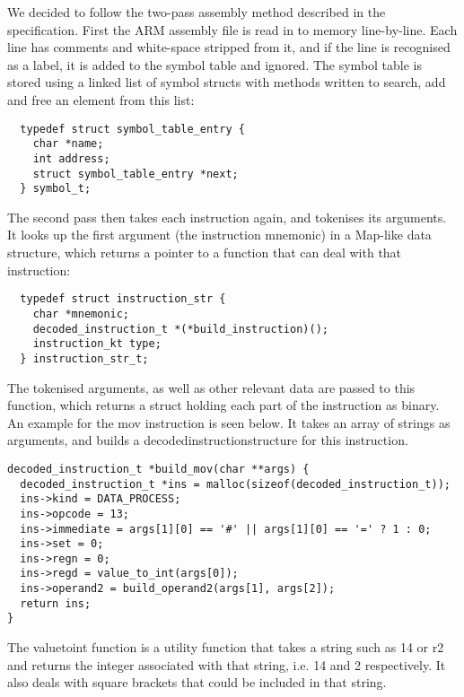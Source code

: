 We decided to follow the two-pass assembly method described in the specification. First the ARM assembly file is read in to memory line-by-line. Each line has comments and white-space stripped from it, and if the line is recognised as a label, it is added to the symbol table and ignored. The symbol table is stored using a linked list of symbol structs with methods written to search, add and free an element from this list:

\begin{verbatim}
  typedef struct symbol_table_entry {
    char *name;
    int address;
    struct symbol_table_entry *next;
  } symbol_t;
\end{verbatim}


The second pass then takes each instruction again, and tokenises its arguments. It looks up the first argument (the instruction mnemonic) in a Map-like data structure, which returns a pointer to a function that can deal with that instruction:

\begin{verbatim}
  typedef struct instruction_str {
    char *mnemonic;
    decoded_instruction_t *(*build_instruction)();
    instruction_kt type;
  } instruction_str_t;
\end{verbatim}

The tokenised arguments, as well as other relevant data are passed to this function, which returns a struct holding each part of the instruction as binary. An example for the mov instruction is seen below. It takes an array of strings as arguments, and builds a decoded\textunderscore{}instruction\textunderscore{}structure for this instruction. 

\begin{verbatim}
decoded_instruction_t *build_mov(char **args) {
  decoded_instruction_t *ins = malloc(sizeof(decoded_instruction_t));
  ins->kind = DATA_PROCESS;
  ins->opcode = 13;
  ins->immediate = args[1][0] == '#' || args[1][0] == '=' ? 1 : 0;
  ins->set = 0;
  ins->regn = 0;
  ins->regd = value_to_int(args[0]);
  ins->operand2 = build_operand2(args[1], args[2]);
  return ins;
}
\end{verbatim}

The value\textunderscore{}to\textunderscore{}int function is a utility function that takes a string such as 14 or r2 and returns the integer associated with that string, i.e. 14 and 2 respectively. It also deals with square brackets that could be included in that string. 

~\\

